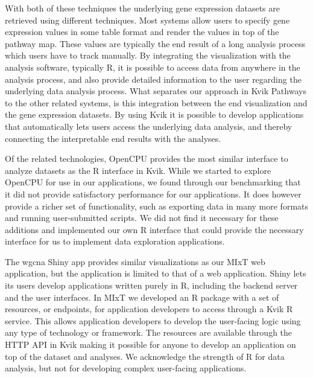 With both of these techniques the underlying gene expression datasets are
retrieved using different techniques. Most systems allow users to specify gene
expression values in some table format and render the values in top of the
pathway map.  These values are typically the end result of a long analysis
process which users have to track manually. By integrating the visualization
with the analysis software, typically R, it is possible to access data from
anywhere in the analysis process, and also provide detailed information to the
user regarding the underlying data analysis process.  What separates our
approach in Kvik Pathways to the other related systems, is this integration
between the end visualization and the gene expression datasets. By using Kvik it
is possible to develop applications that automatically lets users access the
underlying data analysis, and thereby connecting the interpretable end results
with the analyses. 

Of the related technologies, OpenCPU provides the most similar interface to
analyze datasets as the R interface in Kvik. While we started to explore OpenCPU
for use in our applications, we found through our benchmarking that it did not
provide satisfactory performance for our applications. It does however provide a
richer set of functionality, such as exporting data in many more formats and
running user-submitted scripts. We did not find it necessary for these additions
and implemented our own R interface that could provide the necessary interface
for us to implement data exploration applications. 

The \gls{wgcna} Shiny app provides similar visualizations as our MIxT web
application, but the application is limited to that of a web application. Shiny
lets its users develop applications written purely in R, including the backend
server and the user interfaces. In MIxT we developed an R package with a set of
resources, or endpoints, for application developers to access through a Kvik R
service. This allows application developers to develop the user-facing logic
using any type of technology or framework. The resources are available through
the HTTP API in Kvik making it possible for anyone to develop an
application on top of the dataset and analyses. We acknowledge the strength of R
for data analysis, but not for developing complex user-facing applications. 

